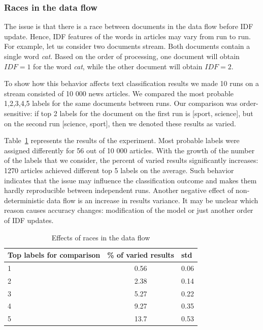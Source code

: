 \subsubsection{Races in the data flow}
The issue is that there is a race between documents in the data flow before IDF update. Hence, IDF features of the words in articles may vary from run to run. For example, let us consider two documents stream. Both documents contain a single word {\em cat}. Based on the order of processing, one document will obtain $IDF=1$ for the word {\em cat}, while the other document will obtain $IDF=2$.

To show how this behavior affects text classification results we made 10 runs on a stream consisted of 10 000 news articles. We compared the most probable 1,2,3,4,5 labels for the same documents between runs. Our comparison was order-sensitive: if top 2 labels for the document on the first run is [sport, science], but on the second run [science, sport], then we denoted these results as varied. 

Table~\ref{race_table} represents the results of the experiment. Most probable labels were assigned differently for 56 out of 10 000 articles. With the growth of the number of the labels that we consider, the percent of varied results significantly increases: 1270 articles achieved different top 5 labels on the average. Such behavior indicates that the issue may influence the classification outcome and makes them hardly reproducible between independent runs. Another negative effect of non-deterministic data flow is an increase in results variance. It may be unclear which reason causes accuracy changes: modification of the model or just another order of IDF updates.

\begin{table}[htbp]
\caption{Effects of races in the data flow}
\begin{threeparttable}
\begin{tabular}{lcl}
Top labels for comparison    & \% of varied results & std    \\
\hline
1   &   0.56    &   0.06    \\
2   &   2.38    &   0.14    \\
3   &   5.27    &   0.22    \\
4   &   9.27    &   0.35    \\
5   &   13.7    &   0.53    \\
\end{tabular}
\end{threeparttable}
\label{race_table}
\end{table}

